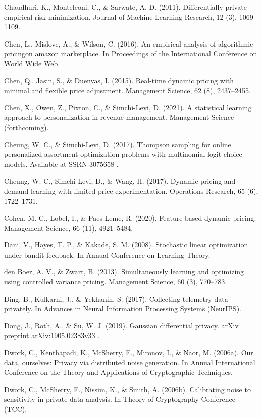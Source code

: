 Chaudhuri, K., Monteleoni, C., \& Sarwate, A. D. (2011). Differentially private empirical risk minimization. Journal of Machine Learning Research, 12 (3), 1069--1109.

Chen, L., Mislove, A., \& Wilson, C. (2016). An empirical analysis of algorithmic pricingon amazon marketplace. In Proceedings of the International Conference on World Wide Web.

Chen, Q., Jasin, S., \& Duenyas, I. (2015). Real-time dynamic pricing with minimal and flexible price adjustment. Management Science, 62 (8), 2437--2455.

Chen, X., Owen, Z., Pixton, C., \& Simchi-Levi, D. (2021). A statistical learning approach to personalization in revenue management. Management Science (forthcoming).

Cheung, W. C., \& Simchi-Levi, D. (2017). Thompson sampling for online personalized assortment optimization problems with multinomial logit choice models. Available at SSRN 3075658 .

Cheung, W. C., Simchi-Levi, D., \& Wang, H. (2017). Dynamic pricing and demand learning with limited price experimentation. Operations Research, 65 (6), 1722--1731.

Cohen, M. C., Lobel, I., \& Paes Leme, R. (2020). Feature-based dynamic pricing. Management Science, 66 (11), 4921--5484.

Dani, V., Hayes, T. P., \& Kakade, S. M. (2008). Stochastic linear optimization under bandit feedback. In Annual Conference on Learning Theory.

den Boer, A. V., \& Zwart, B. (2013). Simultaneously learning and optimizing using controlled variance pricing. Management Science, 60 (3), 770--783.

Ding, B., Kulkarni, J., \& Yekhanin, S. (2017). Collecting telemetry data privately. In Advances in Neural Information Processing Systems (NeurIPS).

Dong, J., Roth, A., \& Su, W. J. (2019). Gaussian differential privacy. arXiv preprint arXiv:1905.02383v33 .

Dwork, C., Kenthapadi, K., McSherry, F., Mironov, I., \& Naor, M. (2006a). Our data, ourselves: Privacy via distributed noise generation. In Annual International Conference on the Theory and Applications of Cryptographic Techniques.

Dwork, C., McSherry, F., Nissim, K., \& Smith, A. (2006b). Calibrating noise to sensitivity in private data analysis. In Theory of Cryptography Conference (TCC).


